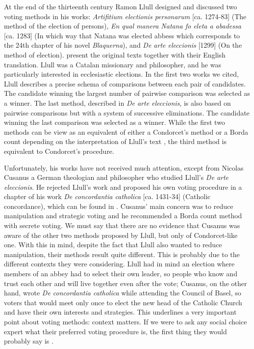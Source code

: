 At the end of the thirteenth century Ramon Llull designed and discussed two voting methods in his works: \textit{Artifitium electionis personarum} [ca. 1274-83] (The method of the election of persons), \textit{En qual manera Natana fo eleta a abadessa} [ca. 1283] (In which way that Natana was elected abbess which corresponds to the 24th chapter of his novel \textit{Blaquerna}), and \textit{De arte eleccionis} [1299] (On the method of election). \cite{Hagele2001} present the original texts together with their English translation. Llull was a Catalan missionary and philosopher, and he was particularly interested in ecclesiastic elections. In the first two works we cited, Llull describes a precise schema of comparisons between each pair of candidates. The candidate winning the largest number of pairwise comparison was selected as a winner. The last method, described in \textit{De arte eleccionis}, is also based on pairwise comparisons but with a system of successive eliminations. The candidate winning the last comparison was selected as a winner. While the first two methods can be view as an equivalent of either a Condorcet's method or a Borda count depending on the interpretation of Llull's text \citep{McLean1990}, the third method is equivalent to Condorcet's procedure.

Unfortunately, his works have not received much attention, except from Nicolas Cusanus a German theologian and philosopher who studied Llull's \textit{De arte eleccionis}. He rejected Llull's work and proposed his own voting procedure in a chapter of his work \textit{De concordantia catholica} [ca. 1431-34] (Catholic concordance), which can be found in \citet[Chapter 4]{McLeanUrken1995}. Cusanus' main concern was to reduce manipulation and strategic voting and he recommended a Borda count method with secrete voting. We must say that there are no evidence that Cusanus was aware of the other two methods proposed by Llull, but only of Condorcet-like one. With this in mind, despite the fact that Llull also wanted to reduce manipulation, their methods result quite different. This is probably due to the different contexts they were considering. Llull had in mind an election where members of an abbey had to select their own leader, so people who know and trust each other and will live together even after the vote; Cusanus, on the other hand, wrote \textit{De concordantia catholica} while attending the Council of Basel, so voters that would meet only once to elect the new head of the Catholic Church and have their own interests and strategies. This underlines a very important point about voting methods: context matters. If we were to ask any social choice expert what their preferred voting procedure is, the first thing they would probably say is .

